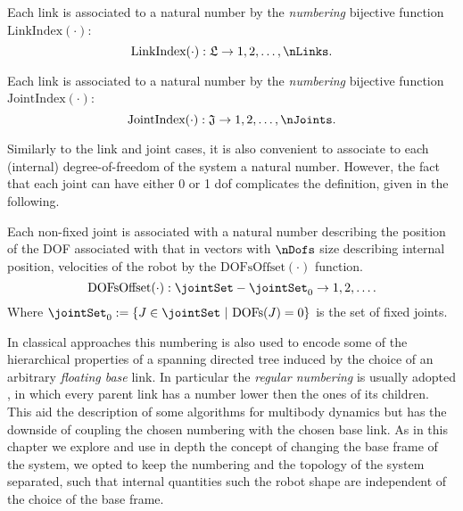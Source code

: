 \begin{definition}
\label{def:linkSerialization}
Each link is associated to a natural number by the \emph{numbering} bijective function $\text{LinkIndex}(\cdot)$:
 \begin{equation}
\text{LinkIndex}(\cdot) : \mathfrak{L} \to {1,2,\dots,\nLinks}.
 \end{equation}
\end{definition}

\begin{definition}
Each link is associated to a natural number by the \emph{numbering} bijective function $\text{JointIndex}(\cdot)$:
 \begin{equation}
\text{JointIndex}(\cdot) : \mathfrak{J} \to {1,2,\dots,\nJoints}.
 \end{equation}
\end{definition}

Similarly to the link and joint cases, it is also convenient to associate to each (internal) degree-of-freedom of the system a natural number. However, the fact that each joint can have either 0 or 1 dof complicates the definition, given in the following. 

\begin{definition}
Each non-fixed joint is associated with a natural number describing the position of the DOF associated with that in vectors with $\nDofs$ size describing internal position, velocities of the robot by the $\text{DOFsOffset}(\cdot)$ function.
\begin{equation}
 {\text{DOFsOffset}}(\cdot) : \jointSet-\jointSet_0 \to 1, 2, \dots .
\end{equation}
Where $\jointSet_0 := \{ J \in \jointSet \  | \  \text{DOFs}(J) = 0  \}$ is the set of fixed joints.  
\end{definition}


\begin{remark}
In classical approaches this numbering is also used to encode some of the hierarchical properties 
 of a spanning directed tree induced by the choice of an arbitrary \emph{floating base} link. In particular the \emph{regular numbering} is usually adopted \citep{featherstone2008,jain2010}, in which every parent link has a number lower then the ones of its children. This aid the description of some algorithms for multibody dynamics but has the downside of coupling the chosen numbering with the chosen base link. As in this chapter we explore and use in depth the concept of changing the base frame of the system, we opted to keep the numbering and the topology of the system separated, such that internal quantities such the robot shape are independent of the choice of the base frame.
\end{remark}

